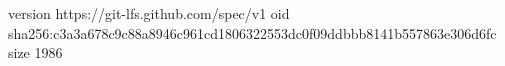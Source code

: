 version https://git-lfs.github.com/spec/v1
oid sha256:c3a3a678c9c88a8946c961cd1806322553dc0f09ddbbb8141b557863e306d6fc
size 1986
